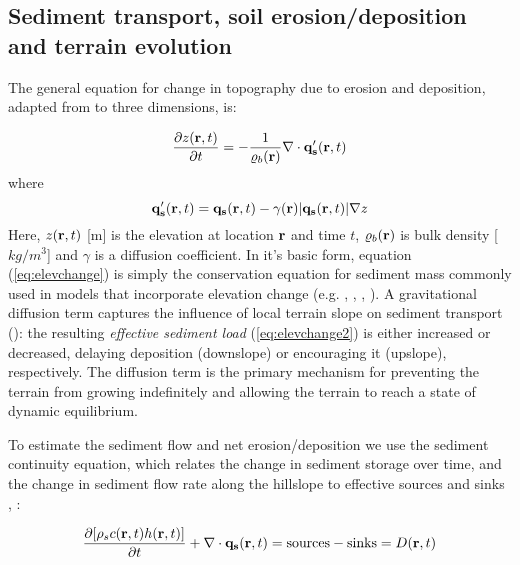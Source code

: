 \documentclass[fleqn,12pt,twoside]{article}
\begin{document}
\subsection{Sediment transport, soil erosion/deposition and terrain evolution}

The general equation for change in topography due to erosion and deposition, adapted
from \cite{karambas02} to three dimensions, is:

\begin{equation}
\label{eq:elevchange}
{\partial z({\bf r},t) \over \partial t} = - {1 \over \varrho_b({\bf r})} \nabla\cdot
{\bf q'_s}({\bf r},t)
\end{equation}
where
\begin{equation}
\label{eq:elevchange2}
{\bf q'_s}({\bf r},t) = {\bf q_s}({\bf r},t) - \gamma({\bf r}) |{\bf q_s}({\bf r},t)| \nabla z
\end{equation}
Here, $z({\bf r},t)$ [m] is the elevation at location ${\bf r}$ and time $t$,
$\varrho_b({\bf r})$ is bulk density [$kg/m^{3}$] and $\gamma$ is a diffusion coefficient.
In it's basic form, equation (\ref{eq:elevchange}) is simply the conservation equation
for sediment mass commonly used in models that incorporate elevation change
(e.g. \cite{child01}, \cite{parker00}, \cite{paola95}, \cite{dietrich93}).
A gravitational diffusion term captures the influence of local terrain slope
on sediment transport (\cite{horikawa88}): the resulting {\it effective sediment load}
(\ref{eq:elevchange2}) is either increased or decreased, delaying deposition
(downslope) or encouraging it (upslope), respectively. The diffusion term
is the primary mechanism for preventing the terrain from growing indefinitely
and allowing the terrain to reach a state of dynamic equilibrium.

To estimate the sediment flow and net erosion/deposition
we use the sediment continuity equation,
which relates the change in sediment storage over time, and the change
in sediment flow rate along the hillslope to effective sources and sinks
\cite{haan94}, \cite{govin91}:

\begin{equation}
\label{eq:sediment}
{\partial [\rho_sc({\bf r},t)h({\bf r},t)] \over \partial t} +
\nabla\cdot {\bf q_s}({\bf r},t) = {\rm sources - sinks}=
D({\bf r},t)
\end{equation}
\end{document}
